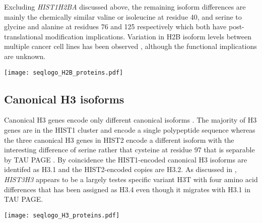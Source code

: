     Excluding \textit{HIST1H2BA} discussed above,
    the remaining isoform differences are mainly the chemically similar valine or isoleucine at residue 40,
    and serine to glycine and alanine at residues 76 and 125 respectively
    which both have post-translational modification implications.
    Variation in H2B isoform levels between multiple cancer cell lines has been observed \citep{Molden2015},
    although the functional implications are unknown.

    \begin{TableAndFigure*}
      \label{tab:H2B-consensus}
      
      \label{fig:H2B-weblogo}
      \texttt{[image: seqlogo\_H2B\_proteins.pdf]}
    \end{TableAndFigure*}

  \subsection{Canonical H3 isoforms}
    Canonical H3 genes encode only \HThreeUniqueProteins{} different canonical isoforms .
    The majority of H3 genes are in the HIST1 cluster and encode a single polypeptide sequence \citep{Ederveen2011}
    whereas the three canonical H3 genes in HIST2 encode a different isoform
    with the interesting difference of serine rather that cysteine at residue 97
    that is separable by TAU PAGE \citep{FranklinZweidler1977}.
    By coincidence the HIST1-encoded canonical H3 isoforms are identifed as H3.1 and the HIST2-encoded copies are H3.2.
    As discussed in , \textit{HIST3H3} appears to be a largely testes specific variant H3T
    with four amino acid differences that has been assigned as H3.4 \citep{Talbert2012}
    even though it migrates with H3.1 in TAU PAGE.

    \begin{TableAndFigure*}
      \label{tab:H3-consensus}
      
      \label{fig:H3-weblogo}
      \texttt{[image: seqlogo\_H3\_proteins.pdf]}
    \end{TableAndFigure*}

